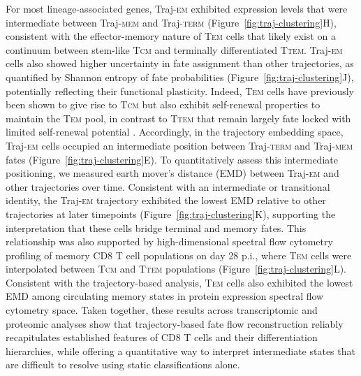 For most lineage-associated genes, Traj-\textsc{em} exhibited expression levels that were intermediate between Traj-\textsc{mem} and Traj-\textsc{term} (Figure~\ref{fig:traj-clustering}H), consistent with the effector-memory nature of T\textsc{em} cells that likely exist on a continuum between stem-like T\textsc{cm} and terminally differentiated T\textsc{tem}. Traj-\textsc{em} cells also showed higher uncertainty in fate assignment than other trajectories, as quantified by Shannon entropy of fate probabilities (Figure~\ref{fig:traj-clustering}J), potentially reflecting their functional plasticity. Indeed, T\textsc{em} cells have previously been shown to give rise to T\textsc{cm} but also exhibit self-renewal properties to maintain the T\textsc{em} pool, in contrast to T\textsc{tem} that remain largely fate locked with limited self-renewal potential \citep{milnerDelineationMolecularlyDistinct2020}. Accordingly, in the trajectory embedding space, Traj-\textsc{em} cells occupied an intermediate position between Traj-\textsc{term} and Traj-\textsc{mem} fates (Figure~\ref{fig:traj-clustering}E). To quantitatively assess this intermediate positioning, we measured earth mover's distance (EMD) between Traj-\textsc{em} and other trajectories over time. Consistent with an intermediate or transitional identity, the Traj-\textsc{em} trajectory exhibited the lowest EMD relative to other trajectories at later timepoints (Figure~\ref{fig:traj-clustering}K), supporting the interpretation that these cells bridge terminal and memory fates. This relationship was also supported by high-dimensional spectral flow cytometry profiling of memory CD8 T cell populations on day 28 p.i., where T\textsc{em} cells were interpolated between T\textsc{cm} and T\textsc{tem} populations (Figure~\ref{fig:traj-clustering}L). Consistent with the trajectory-based analysis, T\textsc{em} cells also exhibited the lowest EMD among circulating memory states in protein expression spectral flow cytometry space. Taken together, these results across transcriptomic and proteomic analyses show that trajectory-based fate flow reconstruction reliably recapitulates established features of CD8 T cells and their differentiation hierarchies, while offering a quantitative way to interpret intermediate states that are difficult to resolve using static classifications alone.

